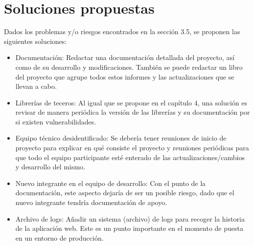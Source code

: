 \section{Soluciones propuestas}
Dados los problemas y/o riesgos encontrados en la sección 3.5, se proponen las siguientes soluciones:
\begin{itemize}
   \item Documentación: Redactar una documentación detallada del proyecto, así como de su desarrollo y modificaciones. También se puede redactar un libro del proyecto que agrupe todos estos informes y las actualizaciones que se llevan a cabo.
    \item Librerías de teceros: Al igual que se propone en el capítulo 4, una solución es revisar de manera periódica la versión de las librerías y su documentación por si existen vulnerabilidades.
    \item Equipo técnico desidentificado: Se debería tener reuniones de inicio de proyecto para explicar en qué consiste el proyecto y reuniones periódicas para que todo el equipo participante esté enterado de las actualizaciones/cambios y desarrollo del mismo.
    \item Nuevo integrante en el equipo de desarrollo: Con el punto de la documentación, este aspecto dejaría de ser un posible riesgo, dado que el nuevo integrante tendría documentación de apoyo.
    \item Archivo de logs: Añadir un sistema (archivo) de logs para recoger la historia de la aplicación web. Este es un punto importante en el momento de puesta en un entorno de producción.
\end{itemize}



